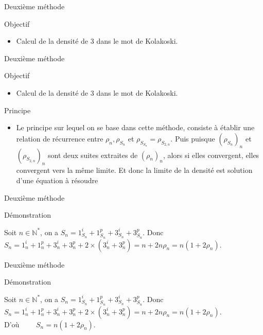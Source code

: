 \documentclass[12pt]{beamer}
\begin{document}
\begin{frame}[t]{Deuxième méthode}
  \begin{block}{Objectif}
    \begin{itemize}
    \item Calcul de la densité de 3 dans le mot de Kolakoski. 
    \end{itemize}
  \end{block}
\end{frame}
\begin{frame}[t]{Deuxième méthode}
  \begin{block}{Objectif}
    \begin{itemize}
    \item Calcul de la densité de 3 dans le mot de Kolakoski. 
    \end{itemize}
  \end{block}
  \begin{block}{Principe}
    \begin{itemize}
    \item Le principe sur lequel on se base dans  cette méthode, consiste à établir une relation de récurrence entre $\rho_n ,\rho_{S_n}$ et $\rho_{S_{S_n}}=\rho_{S_{2,n}}$. 
 Puis puisque  $(\rho_{S_n})_n$ et $(\rho_{S_{2,n}})_n$
  sont deux suites extraites de $(\rho_n)_n$, 
  alors si elles convergent, elles convergent vers la 
  m\^eme limite. Et donc la limite de la densité est 
  solution d'une équation à résoudre
   \end{itemize}
  \end{block}
\end{frame}
\begin{frame}[t]{Deuxième méthode}
  \begin{block}{Démonstration}
  \end{block}
  Soit $n \in \mathbb{N}^*$, on a $S_n=1_{S_n}^i+1_{S_n}^p+3_{S_n}^i+3_{S_n}^p $. Donc\\
 $S_n=1_n^i+1_n^p+3_n^i+3_n^p+2 \times (3_n^i+3_n^p) 
 =n+2n \rho_n =n(1+2 \rho_n)$.\\
\end{frame}
\begin{frame}[t]{Deuxième méthode}
  \begin{block}{Démonstration}
  \end{block}
  Soit $n \in \mathbb{N}^*$, on a $S_n=1_{S_n}^i+1_{S_n}^p+3_{S_n}^i+3_{S_n}^p $. Donc\\
 $S_n=1_n^i+1_n^p+3_n^i+3_n^p+2 \times (3_n^i+3_n^p) 
 =n+2n \rho_n =n(1+2 \rho_n)$.\\
D'où \, \, \, \, $S_n=n(1+2 \rho_n)$.
\end{frame}
\end{document}
